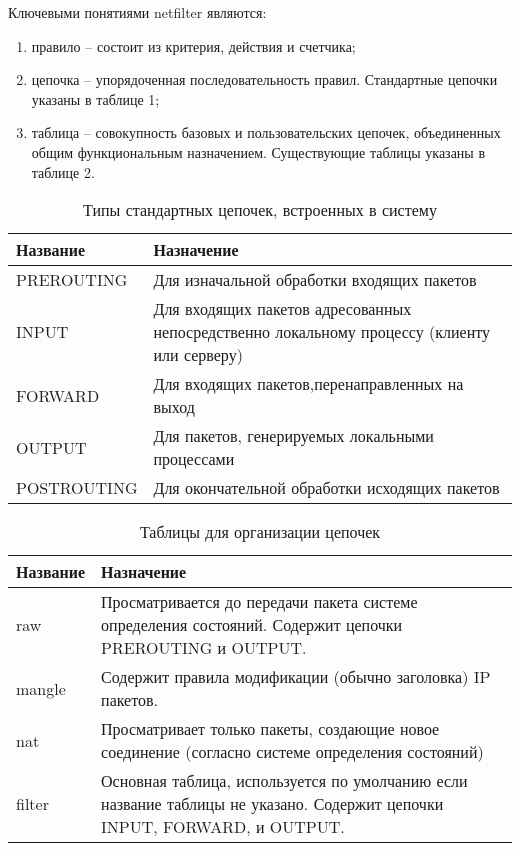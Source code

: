 Ключевыми понятиями netfilter являются:
\begin{enumerate}
	\item правило -- состоит из критерия, действия и счетчика;
	\item цепочка -- упорядоченная последовательность правил. Стандартные цепочки указаны в таблице 1;
	\item таблица -- совокупность базовых и пользовательских цепочек, объединенных общим функциональным назначением. Существующие таблицы указаны в таблице 2.
\end{enumerate}
\begin{table}[h!]
	\caption{Типы стандартных цепочек, встроенных в систему}
	\begin{tabular}{|p{4cm}|p{12.7cm}|}
		\hline
		Название & Назначение \\
		\hline
		PREROUTING  & Для изначальной обработки входящих пакетов \\
		\hline
		INPUT & Для входящих пакетов адресованных непосредственно локальному процессу (клиенту или серверу) \\
		\hline
		FORWARD & Для входящих пакетов,перенаправленных на выход  \\
		\hline
		OUTPUT  & Для пакетов, генерируемых локальными процессами \\
		\hline
		POSTROUTING & Для окончательной обработки исходящих пакетов \\
		\hline
	\end{tabular}
\end{table}

\begin{table}[h!]
	\caption{Таблицы для организации цепочек}
	\begin{tabular}{|p{3cm}|p{13.7cm}|}
		\hline
		Название & Назначение \\
		\hline
		raw & Просматривается до передачи пакета системе определения состояний. Содержит цепочки PREROUTING и OUTPUT. \\
		\hline
		mangle & Содержит правила модификации (обычно заголовка) IP пакетов.\\
		\hline
		nat & Просматривает только пакеты, создающие новое соединение (согласно системе определения состояний) \\
		\hline
		filter & Основная таблица, используется по умолчанию если название таблицы не указано. Содержит цепочки INPUT, FORWARD, и OUTPUT. \\
		\hline
	\end{tabular}
\end{table}

